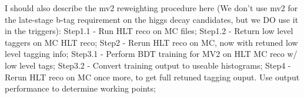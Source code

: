             
        I should also describe the mv2 reweighting procedure here
            (We don't use mv2 for the late-stage b-tag requirement on the higgs decay candidates,
            but we DO use it in the triggers):
            Step1.1 - Run HLT reco on MC files;
            Step1.2 - Return low level taggers on MC HLT reco;
            Step2   - Rerun HLT reco on MC, now with retuned low level tagging info;
            Step3.1 - Perform BDT training for MV2 on HLT MC reco w/ low level tags;
            Step3.2 - Convert training output to useable histograms;
            Step4   - Rerun HLT reco on MC once more, to get full retuned tagging ouput. Use output performance to determine working points;

